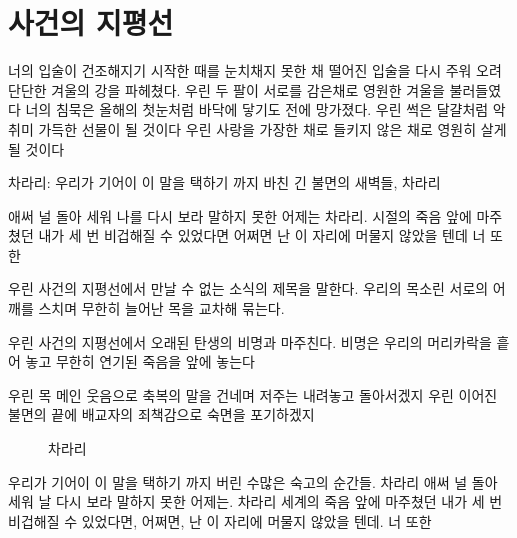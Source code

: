 \hypertarget{uxc0acuxac74uxc758-uxc9c0uxd3c9uxc120}{%

\chapter{사건의 지평선}\label{uxc0acuxac74uxc758-uxc9c0uxd3c9uxc120}}



너의 입술이 건조해지기 시작한 때를 눈치채지 못한 채 떨어진 입술을 다시 주워 오려 단단한 겨울의 강을 파헤쳤다. 우린 두 팔이 서로를 감은채로 영원한 겨울을 불러들였다 너의 침묵은 올해의 첫눈처럼 바닥에 닿기도 전에 망가졌다. 우린 썩은 달걀처럼 악취미 가득한 선물이 될 것이다 우린 사랑을 가장한 채로 들키지 않은 채로 영원히 살게 될 것이다



차라리: 우리가 기어이 이 말을 택하기 까지 바친 긴 불면의 새벽들, 차라리



애써 널 돌아 세워 나를 다시 보라 말하지 못한 어제는 차라리. 시절의 죽음 앞에 마주쳤던 내가 세 번 비겁해질 수 있었다면 어쩌면 난 이 자리에 머물지 않았을 텐데 너 또한



우린 사건의 지평선에서 만날 수 없는 소식의 제목을 말한다. 우리의 목소린 서로의 어깨를 스치며 무한히 늘어난 목을 교차해 묶는다.



우린 사건의 지평선에서 오래된 탄생의 비명과 마주친다. 비명은 우리의 머리카락을 흩어 놓고 무한히 연기된 죽음을 앞에 놓는다



\begin{description}

\item[우린 목 메인 웃음으로 축복의 말을 건네며 저주는 내려놓고 돌아서겠지 우린 이어진 불면의 끝에 배교자의 죄책감으로 숙면을 포기하겠지]

차라리

\end{description}



우리가 기어이 이 말을 택하기 까지 버린 수많은 숙고의 순간들. 차라리 애써 널 돌아 세워 날 다시 보라 말하지 못한 어제는. 차라리 세계의 죽음 앞에 마주쳤던 내가 세 번 비겁해질 수 있었다면, 어쩌면, 난 이 자리에 머물지 않았을 텐데. 너 또한

